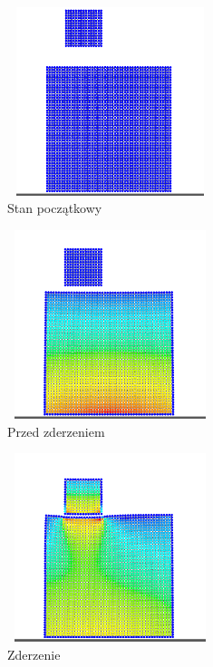 \documentclass[12pt, letterpaper]{report}
\begin{document}
    \begin{figure}[h]

        \begin{subfigure}{0.5\textwidth}
            \centering
            \includegraphics[width=6cm, height=5.5cm]{pressure02_01} 
            \caption{Stan początkowy}
        \end{subfigure}
        \begin{subfigure}{0.5\textwidth}
            \centering
            \includegraphics[width=6cm, height=5.5cm]{pressure02_02}
            \caption{Przed zderzeniem}
        \end{subfigure}
        \begin{subfigure}{0.5\textwidth}
            \centering
            \includegraphics[width=6cm, height=5.5cm]{pressure02_03}
            \caption{Zderzenie}
        \end{subfigure}
        \begin{subfigure}{0.5\textwidth}

\end{subfigure}
\end{figure}
\end{document}
